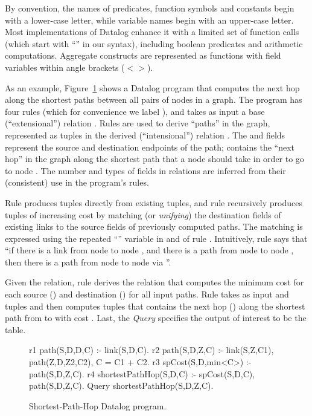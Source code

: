 By convention, the names of predicates, function symbols and constants
begin with a lower-case letter, while variable names begin with an
upper-case letter.  Most implementations of Datalog enhance it with a
limited set of function calls (which start with ``'' in our
syntax), including boolean predicates and arithmetic
computations. Aggregate constructs are represented as functions with
field variables within angle brackets ($<$$>$).
 
As an example, Figure~\ref{fig:background:shortestPath} shows a Datalog
program that computes the next hop along the shortest paths between all
pairs of nodes in a graph.  The program has four rules (which for
convenience we label ), and takes as input a base
(``extensional'') relation .  Rules
 are used to derive ``paths'' in the graph, represented as
tuples in the derived (``intensional'') relation .
The  and  fields represent the source and destination
endpoints of the path;  contains the ``next hop'' in the graph
along the shortest path that a node  should take in order to go to
node . The number and types of fields in relations are inferred
from their (consistent) use in the program's rules.

Rule  produces  tuples directly from existing 
tuples, and rule  recursively produces  tuples of
increasing cost by matching (or {\em unifying}) the destination fields
of existing links to the source fields of previously computed paths. The
matching is expressed using the repeated ``'' variable in
 and  of rule . Intuitively,
rule  says that ``if there is a link from node  to node
, and there is a path from node  to node , then there
is a path from node  to node  via ''.
 
Given the  relation, rule  derives the relation
 that computes the minimum cost  for each source
() and destination () for all input paths. Rule 
takes as input  and  tuples and then computes
 tuples that contains the next hop ()
along the shortest path from  to  with cost . Last,
the {\em Query} specifies the output of interest to be the
 table.


\begin{figure}[h]
\begin{NDlog}
r1 path(S,D,D,C) :- link(S,D,C).
r2 path(S,D,Z,C) :- link(S,Z,C1), path(Z,D,Z2,C2), C = C1 + C2.
r3 spCost(S,D,min<C>) :- path(S,D,Z,C).
r4 shortestPathHop(S,D,C) :- spCost(S,D,C), path(S,D,Z,C).
Query shortestPathHop(S,D,Z,C).
\caption{{\small Shortest-Path-Hop Datalog program.}\label{fig:background:shortestPath}}
\end{NDlog}
\end{figure}


